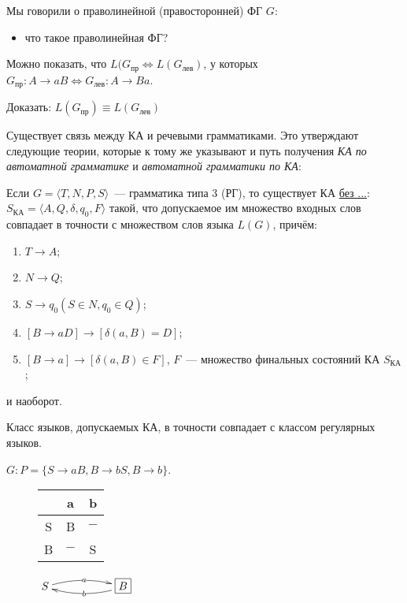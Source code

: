 Мы говорили о праволинейной (правосторонней) ФГ $G$:
\begin{itemize}
\item что такое праволинейная ФГ?
\end{itemize}

Можно показать, что $L(G_{пр} \Leftrightarrow L(G_{лев})$, у которых
$G_{пр} \colon A \to aB \Leftrightarrow G_{лев} \colon A \to Ba$.

Доказать: $L(G_{пр}) \equiv L(G_{лев})$

Существует связь между КА и речевыми грамматиками. Это утверждают
следующие теории, которые к тому же указывают и путь получения \emph{КА по
автоматной грамматике} и \emph{автоматной грамматики по КА}:

\begin{theorem}
  Если $G = \langle T,N,P,S \rangle$~--- грамматика типа 3 (РГ), то
  существует КА \underline{без ...}: $S_{КА} = \langle
  A,Q,\delta,q_0,F \rangle$ такой, что допускаемое им множество
  входных слов совпадает в точности с множеством слов языка $L(G)$,
  причём:
  \begin{enumerate}
  \item $T \to A$;
  \item $N \to Q$;
  \item $S \to q_0$\quad $(S \in N, q_0 \in Q)$;
  \item $[B \to aD] \to [\delta(a,B) = D]$;
  \item $[B \to a] \to [\delta(a,B) \in F]$, $F$~--- множество
    финальных состояний КА $S_{КА}$;
  \end{enumerate}
  и наоборот.
\end{theorem}

\begin{theorem}
  Класс языков, допускаемых КА, в точности совпадает с классом
  регулярных языков.
\end{theorem}

\begin{ex}
  $G\colon P = \{S \to aB, B \to bS, B \to b\}$.
  \begin{figure}[h]
    \centering
    \begin{tabular}{c|cc}
      & a & b\\\hline
      S & B & $-$\\
      B & $-$ & S
    \end{tabular}
    \large\qquad$\xymatrix{S\ar@/^/[rr]|a & &
      \boxed{B}\ar@/^/[ll]|b}$
  \end{figure}
\end{ex}

